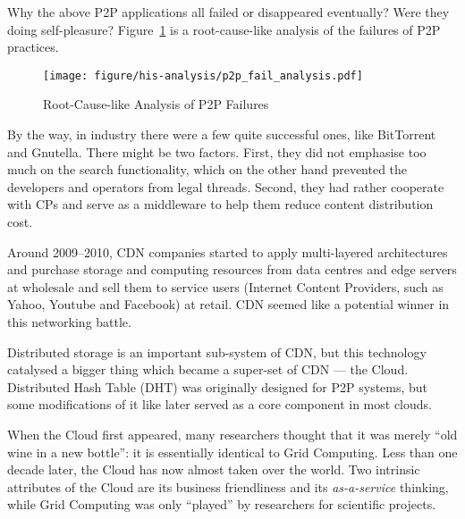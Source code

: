 Why the above P2P applications all failed or disappeared eventually? Were they doing self-pleasure? Figure~\ref{fig:p2p-fail-root} is a root-cause-like analysis of the failures of P2P practices. 
\begin{figure}[ht]
	\centering
	\texttt{[image: figure/his-analysis/p2p\_fail\_analysis.pdf]}
	\caption{Root-Cause-like Analysis of P2P Failures}\label{fig:p2p-fail-root}
\end{figure}

By the way, in industry there were a few quite successful ones, like BitTorrent and Gnutella. There might be two factors. First, they did not emphasise too much on the search functionality, which on the other hand prevented the developers and operators from legal threads. Second, they had rather cooperate with CPs and serve as a middleware to help them reduce content distribution cost. 

Around 2009--2010, CDN companies started to apply multi-layered architectures and purchase storage and computing resources from data centres and edge servers at wholesale and sell them to service users (Internet Content Providers, such as Yahoo, Youtube and Facebook) at retail. CDN seemed like a potential winner in this networking battle. 

Distributed storage is an important sub-system of CDN, but this technology catalysed a bigger thing which became a super-set of CDN --- the Cloud. Distributed Hash Table (DHT) was originally designed for P2P systems, but some modifications of it like \cite{DeCandia:2007:Dynamo} later served as a core component in most clouds. 

When the Cloud first appeared, many researchers thought that it was merely ``old wine in a new bottle'': it is essentially identical to Grid Computing. Less than one decade later, the Cloud has now almost taken over the world. Two intrinsic attributes of the Cloud are its business friendliness and its \emph{as-a-service} thinking, while Grid Computing was only ``played'' by researchers for scientific projects. 


